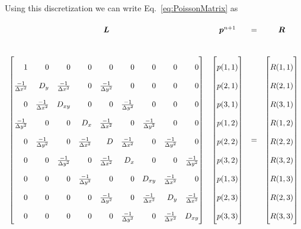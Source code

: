 \documentclass[]{article}
\def\bm#1{\mbox{\boldmath{$#1$}}}
\begin{document}
Using this discretization we can write Eq.~\ref{eq:PoissonMatrix} as
\begin{equation}
  \begin{array}{cccc}
    \bm{L}&\bm{p}^{n+1}&=&\bm{R} \\
    ~\\
    \renewcommand{\arraystretch}{2}
    \begin{bmatrix*}[r]
      1  &   0  &    0  &   0  &    0  &    0  &    0  &    0  &    0\\
      \frac{-1}{\Delta x^2}  &    D_y  &   \frac{-1}{\Delta x^2}  &    0  &   \frac{-1}{\Delta y^2}  &    0  &    0  &    0  &    0\\
      0  &   \frac{-1}{\Delta x^2}  &    D_{xy}  &    0  &    0  &   \frac{-1}{\Delta y^2}  &    0  &    0  &    0\\
      \frac{-1}{\Delta y^2}  &    0  &    0  &    D_x  &   \frac{-1}{\Delta x^2}  &    0  &   \frac{-1}{\Delta y^2}  &    0  &    0\\
      0  &   \frac{-1}{\Delta y^2}  &    0  &   \frac{-1}{\Delta x^2}  &    D  &   \frac{-1}{\Delta x^2}  &    0  &   \frac{-1}{\Delta y^2}  &    0\\
      0  &    0  &   \frac{-1}{\Delta y^2}  &    0  &   \frac{-1}{\Delta x^2}  &    D_x  &    0  &    0  &   \frac{-1}{\Delta y^2}\\
      0  &    0  &    0  &   \frac{-1}{\Delta y^2}  &    0  &    0  &    D_{xy}  &   \frac{-1}{\Delta x^2}  &    0\\
      0  &    0  &    0  &    0  &   \frac{-1}{\Delta y^2}  &    0  &   \frac{-1}{\Delta x^2}  &    D_{y}  &   \frac{-1}{\Delta x^2}\\
      0  &    0  &    0  &    0  &    0  &   \frac{-1}{\Delta y^2}  &    0  &   \frac{-1}{\Delta x^2}  &    D_{xy}\\
    \end{bmatrix*} &
    \renewcommand{\arraystretch}{2}
    \begin{bmatrix}
      p(1,1) \\ p(2,1) \\ p(3,1)\\
      p(1,2) \\ p(2,2) \\ p(3,2)\\
      p(1,3) \\ p(2,3) \\ p(3,3)\\
    \end{bmatrix}&
    =&
    \renewcommand{\arraystretch}{2}
    \begin{bmatrix}
      R(1,1) \\ R(2,1) \\ R(3,1)\\
      R(1,2) \\ R(2,2) \\ R(3,2)\\
      R(1,3) \\ R(2,3) \\ R(3,3)\\
    \end{bmatrix}
  \end{array}
\end{equation}
\end{document}
